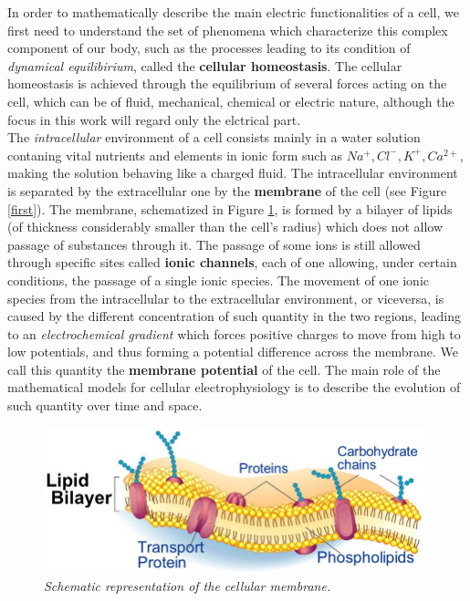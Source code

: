 \documentclass[12pt, a4paper]{report}
\begin{document}
In order to mathematically describe the main electric functionalities of a cell, we first need to understand the set of phenomena which characterize this complex component of our body, such as the processes leading to its condition of \textit{dynamical equilibirium}, called the \textbf{cellular homeostasis}. The cellular homeostasis is achieved through the equilibrium of several forces acting on the cell, which can be of fluid, mechanical, chemical or electric nature, although the focus in this work will regard only the elctrical part.\\
The \textit{intracellular} environment of a cell consists mainly in a water solution contaning vital nutrients and elements in ionic form such as  $Na^+, Cl^-, K^+, Ca^{2+}$, making the solution behaving like a charged fluid. The intracellular environment is separated by the extracellular one by the \textbf{membrane} of the cell (see Figure \ref{first}). The membrane, schematized in Figure \ref{membrane scheme}, is formed by a bilayer of lipids (of thickness considerably smaller than the cell's radius) which does not allow passage of substances through it. The passage of some ions is still allowed through specific sites called \textbf{ionic channels}, each of one allowing, under certain conditions, the passage of a single ionic species. The movement of one ionic species from the intracellular to the extracellular environment, or viceversa, is caused by the different concentration of such quantity in the two regions, leading to an \textit{electrochemical gradient} which forces positive charges to move from high to low potentials, and thus forming a potential difference across the membrane. We call this quantity the \textbf{membrane potential} of the cell. The main role of the mathematical models for cellular electrophysiology is to describe the evolution of such quantity over time and space.
\\
\begin{figure}[H]
	
	
	\centering
	\includegraphics[scale=0.55]{membrane.png}
	
	
	
	\caption{\textit {Schematic representation of the cellular membrane.}} \label{membrane scheme}
	
\end{figure}
\end{document}
